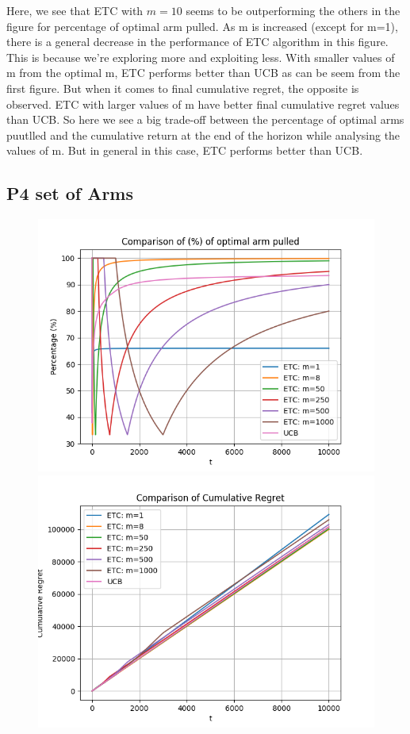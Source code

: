 \documentclass[12pt]{report}
\begin{document}
		\noindent Here, we see that ETC with $m = 10$ seems to be outperforming the others in the figure for percentage of optimal arm pulled. As m is increased (except for m=1), there is a general decrease in the performance of ETC algorithm in this figure. This is because we're exploring more and exploiting less. With smaller values of m from the optimal m, ETC performs better than UCB as can be seem from the first figure. But when it comes to final cumulative regret, the opposite is observed. ETC with larger values of m have better final cumulative regret values than UCB. So here we see a big trade-off between the percentage of optimal arms puutlled and the cumulative return at the end of the horizon while analysing the values of m. But in general in this case, ETC performs better than UCB.
		
		\subsection{P4 set of Arms}
			\begin{figure}[H]
				\includegraphics[scale=0.85]{Figures/Combined_op_P4.png}
				\includegraphics[scale=0.85]{Figures/Combined_regret_P4.png}
			\end{figure}
\end{document}
